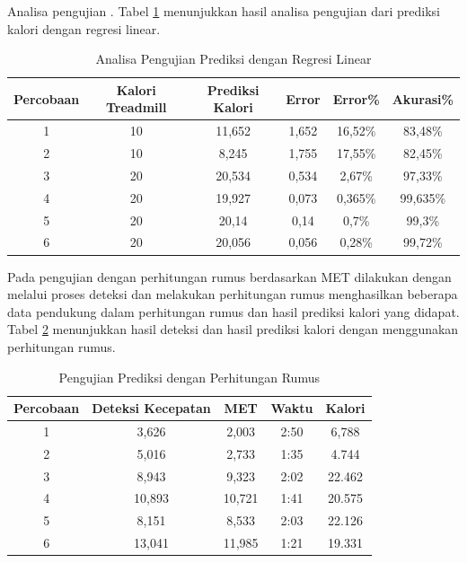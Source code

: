 Analisa pengujian \lipsum[1][1-3]. Tabel \ref{tb:AnalisaPrediksiRegresi} menunjukkan hasil analisa pengujian dari prediksi kalori dengan regresi linear.

\begin{longtable}{|c|c|c|c|c|c|}
  \caption{Analisa Pengujian Prediksi dengan Regresi Linear}
  \label{tb:AnalisaPrediksiRegresi}                                   \\
  \hline
  \rowcolor[HTML]{C0C0C0}
  \textbf{Percobaan} & \textbf{Kalori Treadmill} & \textbf{Prediksi Kalori} & \textbf{Error} & \textbf{Error\%} & \textbf{Akurasi\%} \\
  \hline
  1   & 10   & 11,652   & 1,652    & 16,52\%     & 83,48\%   \\
  \hline
  2   & 10   & 8,245    & 1,755    & 17,55\%     & 82,45\%   \\
  \hline
  3   & 20   & 20,534   & 0,534    & 2,67\%      & 97,33\%   \\
  \hline
  4   & 20   & 19,927   & 0,073    & 0,365\%     & 99,635\%  \\
  \hline
  5   & 20   & 20,14    & 0,14     & 0,7\%       & 99,3\%    \\
  \hline
  6   & 20   & 20,056   & 0,056    & 0,28\%      & 99,72\%   \\
  \hline
\end{longtable}

Pada pengujian dengan perhitungan rumus berdasarkan MET dilakukan dengan melalui proses deteksi dan melakukan perhitungan rumus menghasilkan beberapa data pendukung dalam perhitungan rumus dan hasil prediksi kalori yang didapat. Tabel \ref{tb:PengujianPrediksiPerhitungan} menunjukkan hasil deteksi dan hasil prediksi kalori dengan menggunakan perhitungan rumus.

\begin{longtable}{|c|c|c|c|c|}
  \caption{Pengujian Prediksi dengan Perhitungan Rumus}
  \label{tb:PengujianPrediksiPerhitungan}                                   \\
  \hline
  \rowcolor[HTML]{C0C0C0}
  \textbf{Percobaan} & \textbf{Deteksi Kecepatan} & \textbf{MET} & \textbf{Waktu} & \textbf{Kalori} \\
  \hline
  1   & 3,626   & 2,003    & 2:50    & 6,788   \\
  \hline
  2   & 5,016   & 2,733    & 1:35    & 4.744   \\
  \hline
  3   & 8,943   & 9,323    & 2:02    & 22.462  \\
  \hline
  4   & 10,893  & 10,721   & 1:41    & 20.575  \\
  \hline
  5   & 8,151   & 8,533    & 2:03    & 22.126  \\
  \hline
  6   & 13,041  & 11,985   & 1:21    & 19.331  \\
  \hline
\end{longtable}

